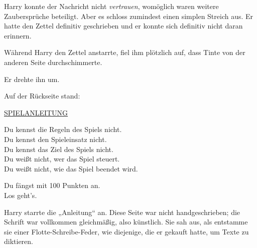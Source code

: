 Harry konnte der Nachricht nicht \emph{vertrauen}, womöglich waren weitere Zaubersprüche beteiligt. Aber es schloss zumindest einen simplen Streich aus. Er hatte den Zettel definitiv geschrieben und er konnte sich definitiv nicht daran erinnern.

Während Harry den Zettel anstarrte, fiel ihm plötzlich auf, dass Tinte von der anderen Seite durchschimmerte.

Er drehte ihn um.

Auf der Rückseite stand:

\begin{writtenNote}\centering
\textsc{\underline{\uppercase{Spielanleitung}}}



Du kennst die Regeln des Spiels nicht.\\
Du kennst den Spieleinsatz nicht.\\
Du kennst das Ziel des Spiels nicht.\\
Du weißt nicht, wer das Spiel steuert.\\
Du weißt nicht, wie das Spiel beendet wird.

Du fängst mit 100 Punkten an.\\
Los geht’s.
\end{writtenNote}

Harry starrte die „Anleitung“ an. Diese Seite war nicht handgeschrieben; die Schrift war vollkommen gleichmäßig, also künstlich. Sie sah aus, als entstamme sie einer Flotte-Schreibe-Feder, wie diejenige, die er gekauft hatte, um Texte zu diktieren.

